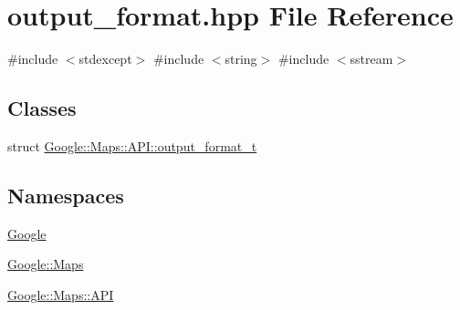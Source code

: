 \hypertarget{a00023}{}\section{output\+\_\+format.\+hpp File Reference}
\label{a00023}
{\ttfamily \#include $<$stdexcept$>$}\newline
{\ttfamily \#include $<$string$>$}\newline
{\ttfamily \#include $<$sstream$>$}\newline
\subsection*{Classes}
\begin{DoxyCompactItemize}
\item 
struct \hyperlink{a00048}{Google\+::\+Maps\+::\+A\+P\+I\+::output\+\_\+format\+\_\+t}
\end{DoxyCompactItemize}
\subsection*{Namespaces}
\begin{DoxyCompactItemize}
\item 
 \hyperlink{a00032}{Google}
\item 
 \hyperlink{a00033}{Google\+::\+Maps}
\item 
 \hyperlink{a00034}{Google\+::\+Maps\+::\+A\+PI}
\end{DoxyCompactItemize}
